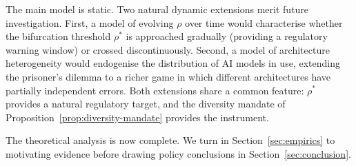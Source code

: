 The main model is static. Two natural dynamic extensions merit future investigation. First, a model of evolving $\rho$ over time would characterise whether the bifurcation threshold $\rho^*$ is approached gradually (providing a regulatory warning window) or crossed discontinuously. Second, a model of architecture heterogeneity would endogenise the distribution of AI models in use, extending the prisoner's dilemma to a richer game in which different architectures have partially independent errors. Both extensions share a common feature: $\rho^*$ provides a natural regulatory target, and the diversity mandate of Proposition~\ref{prop:diversity-mandate} provides the instrument.

The theoretical analysis is now complete. We turn in Section~\ref{sec:empirics} to motivating evidence before drawing policy conclusions in Section~\ref{sec:conclusion}.
